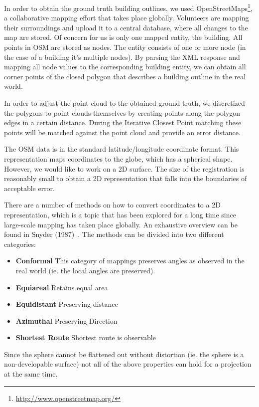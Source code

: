 \documentclass[10pt,twocolumn,letterpaper]{article}
\begin{document}
In order to obtain the ground truth building outlines, we used OpenStreetMaps\footnote{\url{http://www.openstreetmap.org/}}, a collaborative mapping effort that takes place globally. Volunteers are mapping their surroundings and upload it to a central database, where all changes to the map are stored. 
Of concern for us is only one mapped entity, the building. All points in OSM are stored as nodes. The entity consists of one or more node (in the case of a building it's multiple nodes). By parsing the XML response and mapping all node values to the corresponding building entity, we can obtain all corner points of the closed polygon that describes a building outline in the real world.

In order to adjust the point cloud to the obtained ground truth, we discretized the polygons to point clouds themselves by creating points along the polygon edges in a certain distance. During the Iterative Closest Point matching these points will be matched against the point cloud and provide an error distance.

The OSM data is in the standard latitude/longitude coordinate format. This representation maps coordinates to the globe, which has a spherical shape. However, we would like to work on a 2D surface. The size of the registration is reasonably small to obtain a 2D representation that falls into the boundaries of acceptable error.

There are a number of methods on how to convert coordinates to a 2D representation, which is a topic that has been explored for a long time since large-scale mapping has taken place globally. An exhaustive overview can be found in Snyder (1987)~\cite{Snyder1987}. The methods can be divided into two different categories:

\begin{itemize}
   \item \textbf{Conformal} This category of mappings preserves angles as observed in the real world (ie. the local angles are preserved). 
   \item \textbf{Equiareal} Retains equal area
   \item \textbf{Equidistant} Preserving distance
   \item \textbf{Azimuthal} Preserving Direction
   \item \textbf{Shortest Route} Shortest route is observable 
\end{itemize}

Since the sphere cannot be flattened out without distortion (ie. the sphere is a non-developable surface) not all of the above properties can hold for a projection at the same time.
\end{document}
